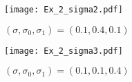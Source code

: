 \documentclass[a4paper,11pt]{article}
\begin{document}
\begin{figure}[H]
  \center
  \texttt{[image: Ex\_2\_sigma2.pdf]}
  \caption{\label{fig:2.2} $(\sigma, \sigma_{0}, \sigma_{1}) = (0.1, 0.4, 0.1)$}
\end{figure}

\begin{figure}[H]
  \center
  \texttt{[image: Ex\_2\_sigma3.pdf]}
  \caption{\label{fig:2.3} $(\sigma, \sigma_{0}, \sigma_{1}) = (0.1, 0.1, 0.4)$}
\end{figure}

\subsection{}


\end{document}

